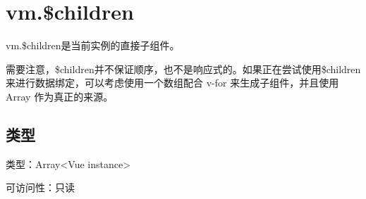 \begin{lstlisting}[language=JavaScript]

\end{lstlisting}




\begin{lstlisting}[language=JavaScript]

\end{lstlisting}




\begin{lstlisting}[language=JavaScript]

\end{lstlisting}



\section{vm.\$children}

vm.\$children是当前实例的直接子组件。



需要注意，\$children并不保证顺序，也不是响应式的。如果正在尝试使用\$children来进行数据绑定，可以考虑使用一个数组配合 v-for 来生成子组件，并且使用 Array 作为真正的来源。


\subsection{类型}

\begin{compactitem}
\item 类型：Array<Vue instance>
\item 可访问性：只读
\end{compactitem}

\begin{lstlisting}[language=JavaScript]

\end{lstlisting}




\begin{lstlisting}[language=JavaScript]

\end{lstlisting}




\begin{lstlisting}[language=JavaScript]

\end{lstlisting}



